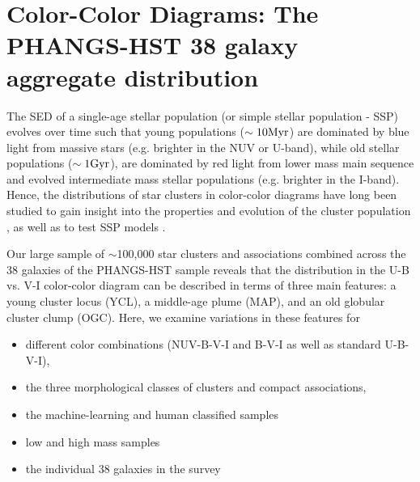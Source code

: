 \documentclass[linenumbers]{aastex63}
\begin{document}
\section{Color-Color Diagrams: The PHANGS-HST 38 galaxy aggregate distribution}\label{sect:color_color}
The SED of a single-age stellar population (or simple stellar population - SSP) evolves over time such that young populations ($\sim 10 {\rm Myr}$) are dominated by blue light from massive stars (e.g. brighter in the NUV or U-band), while old stellar populations ($\sim 1 {\rm Gyr}$), are dominated by red light from lower mass main sequence and evolved intermediate mass stellar populations (e.g. brighter in the I-band).  
Hence, the distributions of star clusters in color-color diagrams have long been studied to gain insight into the properties and evolution of the cluster population 
\citep[e.g.,][]{van_den_bergh_ubv_1968,searle_classification_1980,
girardi_age_1995, larsen_young_1999, chandar_luminosity_2010, adamo_legacy_2017}, 
as well as to test SSP models \citep[e.g.,][]{bruzual_stellar_2003,vazquez_optimization_2005,maraston_evolutionary_1998}.




Our large sample of $\sim$100,000 star clusters and associations combined across the 38 galaxies of the PHANGS-HST sample reveals that the distribution in the U-B vs. V-I color-color diagram %
can be described in terms of three main features: a young cluster locus (YCL), a middle-age plume (MAP), and an old globular cluster clump (OGC).   %
Here, we examine variations in these features for 
\begin{itemize}
\item different color combinations (NUV-B-V-I and B-V-I as well as standard U-B-V-I), 
\item the three morphological classes of clusters and compact associations, 
\item the machine-learning and human classified samples
\item low and high mass samples
\item the individual 38 galaxies in the survey
\end{itemize}
\end{document}
